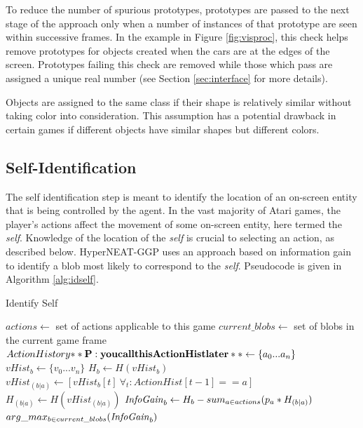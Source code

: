 \documentclass{sig-alternate}
\begin{document}
To reduce the number of spurious prototypes, prototypes are passed to the next stage of the approach only when a number of instances of that prototype are seen within successive frames. In the example in Figure \ref{fig:visproc}, this check helps remove prototypes for objects created when the cars are at the edges of the screen. Prototypes failing this check are removed while those which pass are assigned a unique real number (see Section \ref{sec:interface} for more details).

Objects are assigned to the same class if their shape is relatively similar without taking color into consideration. This assumption has a potential drawback in certain games if different objects have similar shapes but different colors.  

\subsection{Self-Identification}
The self identification step is meant to identify the location of an on-screen entity that is being controlled by the agent. In the vast majority of Atari games, the player's actions affect the movement of some on-screen entity, here termed the \textit{self}. Knowledge of the location of the \textit{self} is crucial to selecting an action, as described below. HyperNEAT-GGP uses an approach based on information gain to identify a blob most likely to correspond to the \textit{self}. Pseudocode is given in Algorithm \ref{alg:idself}.

\begin{algorithm}
\caption{Identify Self}
\label{alg:idself}
\begin{algorithmic}[1]
  \STATE $actions \leftarrow $ set of actions applicable to this game
  \STATE $current\_blobs \leftarrow $ set of blobs in the current game frame
  \STATE $ActionHistory {\bf **P: you call this ActionHist later**} \leftarrow \{a_0...a_n\}$ %
  \STATE $vHist_b \leftarrow \{v_0...v_n\}$  %
  \STATE $H_b \leftarrow H(vHist_b)$ 
  \STATE $vHist_{(b|a)} \leftarrow [vHist_b[t] ~\forall_t: ActionHist[t-1] == a]$ 
  \STATE $H_{(b|a)} \leftarrow H(vHist_{(b|a)})$ %
  \ENDFOR
  \STATE $\textrm{\emph{InfoGain}}_b \leftarrow H_b - sum_{a \in actions}(p_a * H_{(b|a)})$ %
  \ENDFOR
  \RETURN $arg\_max_{b \in current\_blobs}(\textrm{\emph{InfoGain}}_b)$ %
\end{algorithmic}
\end{algorithm}
\end{document}
